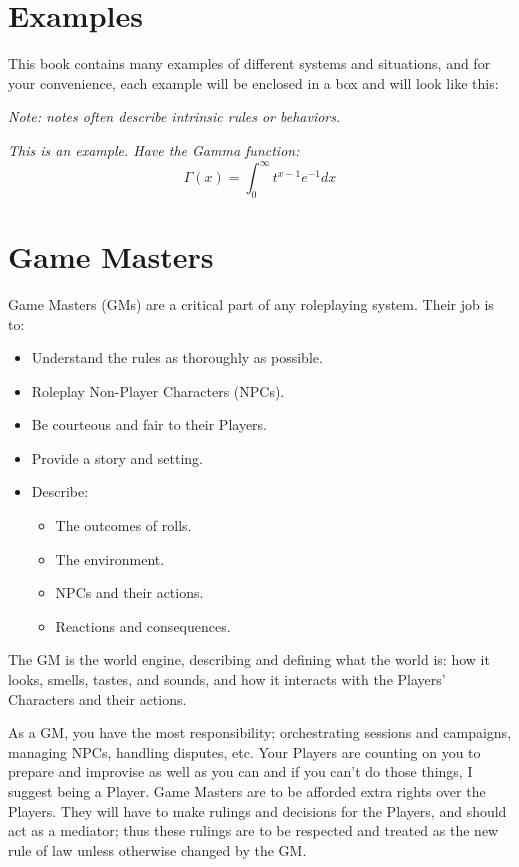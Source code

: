 \documentclass[../main.tex]{subfiles}
\begin{document}
    \section{Examples}

    This book contains many examples of different systems and situations, and for your convenience, each example will be enclosed in a box and will look like this:
    
    \emph{Note: notes often describe intrinsic rules or behaviors.}
    \begin{mdframed}[style=Arrata]
        \emph{This is an example. Have the Gamma function:}
        \begin{equation*}
            \Gamma(x) = \int_{0}^{\infty}t^{x-1}e^{-1}dx
        \end{equation*}
    \end{mdframed}

    \section{Game Masters}

    Game Masters (GMs) are a critical part of any roleplaying system. Their job is to:

    \begin{itemize}
        \item Understand the rules as thoroughly as possible.
        \item Roleplay Non-Player Characters (NPCs).
        \item Be courteous and fair to their Players.
        \item Provide a story and setting.
        \item Describe:
        \begin{itemize}
            \item The outcomes of rolls.
            \item The environment.
            \item NPCs and their actions.
            \item Reactions and consequences.
        \end{itemize}
    \end{itemize}
    
    The GM is the world engine, describing and defining what the world is: how it looks, smells, tastes, and sounds, and how it interacts with the Players' Characters and their actions.
    
    As a GM, you have the most responsibility; orchestrating sessions and campaigns, managing NPCs, handling disputes, etc. Your Players are counting on you to prepare and improvise as well as you can and if you can't do those things, I suggest being a Player.
    Game Masters are to be afforded extra rights over the Players. They will have to make rulings and decisions for the Players, and should act as a mediator; thus these rulings are to be respected and treated as the new rule of law unless otherwise changed by the GM.
\end{document}
